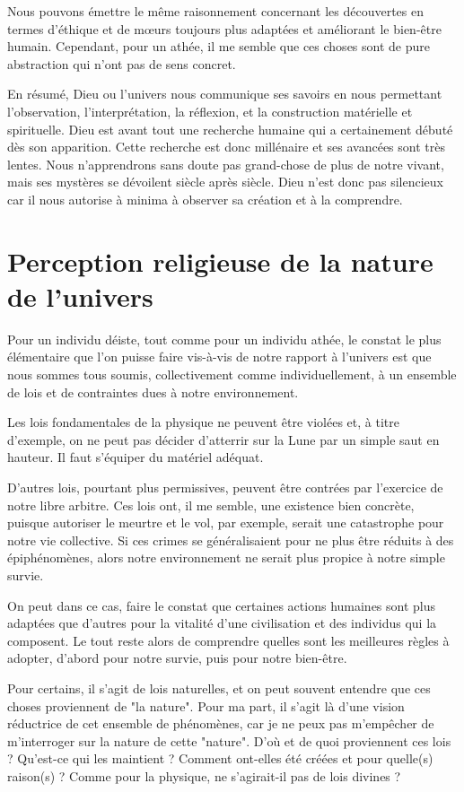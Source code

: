 Nous pouvons émettre le même raisonnement concernant les découvertes en termes d'éthique et de mœurs toujours plus adaptées et améliorant le bien-être humain. Cependant, pour un athée, il me semble que ces choses sont de pure abstraction qui n'ont pas de sens concret.

En résumé, Dieu ou l'univers nous communique ses savoirs en nous permettant l'observation, l'interprétation, la réflexion, et la construction matérielle et spirituelle. Dieu est avant tout une recherche humaine qui a certainement débuté dès son apparition. Cette recherche est donc millénaire et ses avancées sont très lentes. Nous n'apprendrons sans doute pas grand-chose de plus de notre vivant, mais ses mystères se dévoilent siècle après siècle. Dieu n'est donc pas silencieux car il nous autorise à minima à observer sa création et à la comprendre.



\chapter{Perception religieuse de la nature de l'univers}

Pour un individu déiste, tout comme pour un individu athée, le constat le plus élémentaire que l’on puisse faire vis-à-vis de notre rapport à l’univers est que nous sommes tous soumis, collectivement comme individuellement, à un ensemble de lois et de contraintes dues à notre environnement.

Les lois fondamentales de la physique ne peuvent être violées et, à titre d’exemple, on ne peut pas décider d’atterrir sur la Lune par un simple saut en hauteur. Il faut s’équiper du matériel adéquat.

D’autres lois, pourtant plus permissives, peuvent être contrées par l’exercice de notre libre arbitre. Ces lois ont, il me semble, une existence bien concrète, puisque autoriser le meurtre et le vol, par exemple, serait une catastrophe pour notre vie collective. Si ces crimes se généralisaient pour ne plus être réduits à des épiphénomènes, alors notre environnement ne serait plus propice à notre simple survie.

On peut dans ce cas, faire le constat que certaines actions humaines sont plus adaptées que d’autres pour la vitalité d’une civilisation et des individus qui la composent. Le tout reste alors de comprendre quelles sont les meilleures règles à adopter, d’abord pour notre survie, puis pour notre bien-être.

Pour certains, il s’agit de lois naturelles, et on peut souvent entendre que ces choses proviennent de "la nature". Pour ma part, il s’agit là d’une vision réductrice de cet ensemble de phénomènes, car je ne peux pas m’empêcher de m’interroger sur la nature de cette "nature". D’où et de quoi proviennent ces lois ? Qu’est-ce qui les maintient ? Comment ont-elles été créées et pour quelle(s) raison(s) ? Comme pour la physique, ne s'agirait-il pas de lois divines ?

